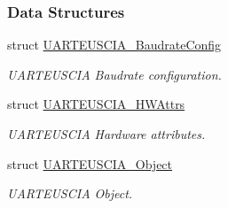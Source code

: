 \subsubsection*{Data Structures}
\begin{DoxyCompactItemize}
\item 
struct \hyperlink{struct_u_a_r_t_e_u_s_c_i_a___baudrate_config}{U\+A\+R\+T\+E\+U\+S\+C\+I\+A\+\_\+\+Baudrate\+Config}
\begin{DoxyCompactList}\small\item\em U\+A\+R\+T\+E\+U\+S\+C\+I\+A Baudrate configuration. \end{DoxyCompactList}\item 
struct \hyperlink{struct_u_a_r_t_e_u_s_c_i_a___h_w_attrs}{U\+A\+R\+T\+E\+U\+S\+C\+I\+A\+\_\+\+H\+W\+Attrs}
\begin{DoxyCompactList}\small\item\em U\+A\+R\+T\+E\+U\+S\+C\+I\+A Hardware attributes. \end{DoxyCompactList}\item 
struct \hyperlink{struct_u_a_r_t_e_u_s_c_i_a___object}{U\+A\+R\+T\+E\+U\+S\+C\+I\+A\+\_\+\+Object}
\begin{DoxyCompactList}\small\item\em U\+A\+R\+T\+E\+U\+S\+C\+I\+A Object. \end{DoxyCompactList}\end{DoxyCompactItemize}
